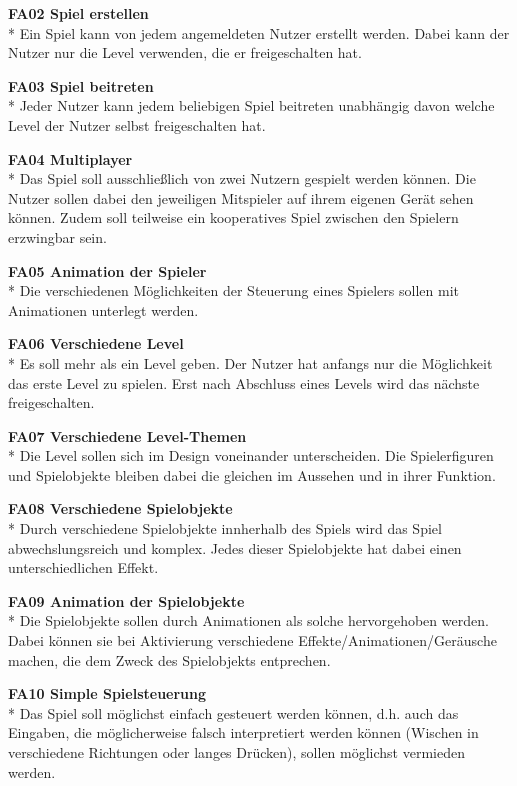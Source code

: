\textbf{FA02 Spiel erstellen}\\*
Ein Spiel kann von jedem angemeldeten Nutzer erstellt werden. Dabei kann der Nutzer nur die Level verwenden, die er freigeschalten hat.

\textbf{FA03 Spiel beitreten}\\*
Jeder Nutzer kann jedem beliebigen Spiel beitreten unabhängig davon welche Level der Nutzer selbst freigeschalten hat.

\textbf{FA04 Multiplayer}\\*
Das Spiel soll ausschließlich von zwei Nutzern gespielt werden können. Die Nutzer sollen dabei den jeweiligen Mitspieler auf ihrem eigenen Gerät sehen können. Zudem soll teilweise ein kooperatives Spiel zwischen den Spielern erzwingbar sein.

\textbf{FA05 Animation der Spieler}\\*
Die verschiedenen Möglichkeiten der Steuerung eines Spielers sollen mit Animationen unterlegt werden. 

\textbf{FA06 Verschiedene Level}\\*
Es soll mehr als ein Level geben. Der Nutzer hat anfangs nur die Möglichkeit das erste Level zu spielen. Erst nach Abschluss eines Levels wird das nächste freigeschalten.

\textbf{FA07 Verschiedene Level-Themen}\\*
Die Level sollen sich im Design voneinander unterscheiden. Die Spielerfiguren und Spielobjekte bleiben dabei die gleichen im Aussehen und in ihrer Funktion.

\textbf{FA08 Verschiedene Spielobjekte}\\*
Durch verschiedene Spielobjekte innherhalb des Spiels wird das Spiel abwechslungsreich und komplex. Jedes dieser Spielobjekte hat dabei einen unterschiedlichen Effekt.

\textbf{FA09 Animation der Spielobjekte}\\*
Die Spielobjekte sollen durch Animationen als solche hervorgehoben werden. Dabei können sie bei Aktivierung verschiedene Effekte/Animationen/Geräusche machen, die dem Zweck des Spielobjekts entprechen.

\textbf{FA10 Simple Spielsteuerung}\\*
Das Spiel soll möglichst einfach gesteuert werden können, d.h. auch das Eingaben, die möglicherweise falsch interpretiert werden können (Wischen in verschiedene Richtungen oder langes Drücken), sollen möglichst vermieden werden.



